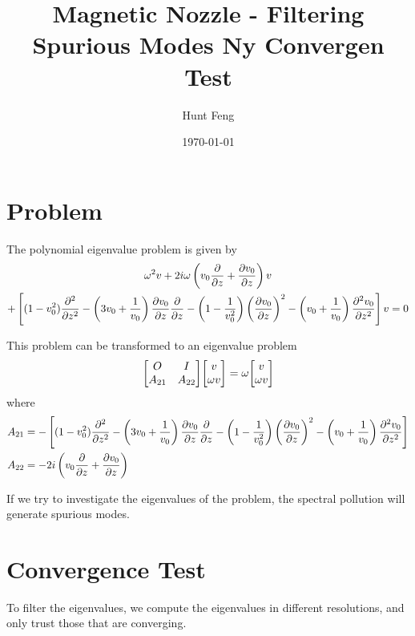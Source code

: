 \documentclass{article}
\title{Magnetic Nozzle - Filtering Spurious Modes Ny Convergen Test}
\author{Hunt Feng}
\date{\today}
\begin{document}
    \maketitle
    
    \section*{Problem}
    The polynomial eigenvalue problem is given by
    \begin{multline} \label{eq:polynomial-eigenvalue-problem}
        \omega^2 v 
        + 2i\omega\left(v_0\pdv{}{z} + \pdv{v_0}{z}\right) v \\
        + \left[ (1-v_0^2)\pdv[2]{}{z}
        -\left(3v_0 + \frac{1}{v_0}\right)\pdv{v_0}{z}\pdv{}{z} 
        - \left(1-\frac{1}{v_0^2}\right)\left(\pdv{v_0}{z}\right)^2 
        - \left(v_0+\frac{1}{v_0}\right)\pdv[2]{v_0}{z} \right]v
        = 0
    \end{multline}

    This problem can be transformed to an eigenvalue problem
    \begin{equation}
        \mqty[ O & I\\A_{21} & A_{22} ]\mqty[ v\\ \omega v] = \omega\mqty[ v\\ \omega v]
        \label{eq:eigenvalue-problem}
    \end{equation}
    where 
    \begin{align*}
        A_{21} &= -\left[ (1-v_0^2)\pdv[2]{}{z}
        -\left(3v_0 + \frac{1}{v_0}\right)\pdv{v_0}{z}\pdv{}{z} 
        - \left(1-\frac{1}{v_0^2}\right)\left(\pdv{v_0}{z}\right)^2 
        - \left(v_0+\frac{1}{v_0}\right)\pdv[2]{v_0}{z} \right] \\
        A_{22} &= -2i\left(v_0\pdv{}{z} + \pdv{v_0}{z}\right)
    \end{align*}

    If we try to investigate the eigenvalues of the problem, the spectral pollution will generate spurious modes.

    \newpage
    \section*{Convergence Test}
    To filter the eigenvalues, we compute the eigenvalues in different resolutions, and only trust those that are converging.
\end{document}

